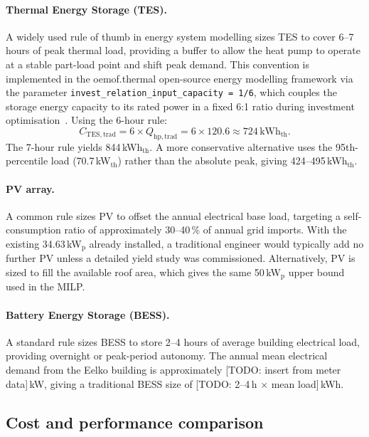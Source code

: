 \documentclass[11pt,a4paper]{report}
\begin{document}
\paragraph{Thermal Energy Storage (TES).}
A widely used rule of thumb in energy system modelling sizes TES to cover 6--7
hours of peak thermal load, providing a buffer to allow the heat pump to operate
at a stable part-load point and shift peak demand.
This convention is implemented in the oemof.thermal open-source energy modelling
framework via the parameter \texttt{invest\_relation\_input\_capacity = 1/6},
which couples the storage energy capacity to its rated power in a fixed 6:1 ratio
during investment optimisation~\cite{oemofthermal2024}.
Using the 6-hour rule:
\begin{equation}
    C_\mathrm{TES,trad} = 6 \times Q_\mathrm{hp,trad}
    = 6 \times 120.6 \approx 724\,\mathrm{kWh_{th}}.
    \label{eq:tes_rule}
\end{equation}
The 7-hour rule yields 844\,kWh$_\mathrm{th}$.
A more conservative alternative uses the 95th-percentile load
(70.7\,kW$_\mathrm{th}$) rather than the absolute peak, giving
424--495\,kWh$_\mathrm{th}$.

\paragraph{PV array.}
A common rule sizes PV to offset the annual electrical base load, targeting a
self-consumption ratio of approximately 30--40\,\% of annual grid imports.
With the existing 34.63\,kW$_\mathrm{p}$ already installed, a traditional
engineer would typically add no further PV unless a detailed yield study
was commissioned.
Alternatively, PV is sized to fill the available roof area, which gives the
same 50\,kW$_\mathrm{p}$ upper bound used in the MILP.

\paragraph{Battery Energy Storage (BESS).}
A standard rule sizes BESS to store 2--4 hours of average building electrical
load, providing overnight or peak-period autonomy.
The annual mean electrical demand from the Eelko building is approximately
[TODO: insert from meter data]\,kW, giving a traditional BESS size of
[TODO: 2--4\,h $\times$ mean load]\,kWh.

\subsection{Cost and performance comparison}
\label{sub:trad_comparison}
\end{document}
